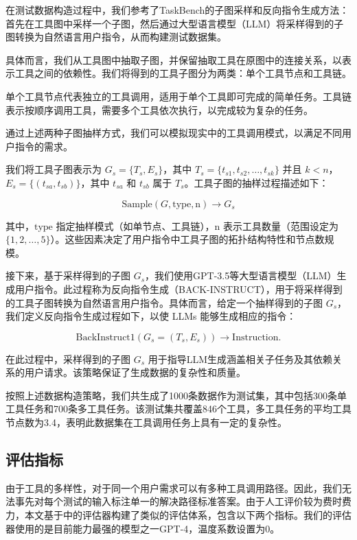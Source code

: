 在测试数据构造过程中，我们参考了TaskBench的子图采样和反向指令生成方法：首先在工具图中采样一个子图，然后通过大型语言模型（LLM）将采样得到的子图转换为自然语言用户指令，从而构建测试数据集。

具体而言，我们从工具图中抽取子图，并保留抽取工具在原图中的连接关系，以表示工具之间的依赖性。我们将得到的工具子图分为两类：单个工具节点和工具链。

单个工具节点代表独立的工具调用，适用于单个工具即可完成的简单任务。工具链表示按顺序调用工具，需要多个工具依次执行，以完成较为复杂的任务。

通过上述两种子图抽样方式，我们可以模拟现实中的工具调用模式，以满足不同用户指令的需求。

我们将工具子图表示为 \( G_s = \{T_s, E_s\} \)，其中 \( T_s = \{t_{s1}, t_{s2}, \dots, t_{sk}\} \) 并且 \( k < n \)，\( E_s = \{(t_{sa}, t_{sb})\} \)，其中 \( t_{sa} \) 和 \( t_{sb} \) 属于 \( T_s \)。工具子图的抽样过程描述如下：

\[
\text{Sample}(G, \text{type}, \text{n}) \rightarrow G_s
\]

其中，\(\text{type}\) 指定抽样模式（如单节点、工具链），\(\text{n}\) 表示工具数量（范围设定为 \(\{1, 2, \dots, 5\}\)）。这些因素决定了用户指令中工具子图的拓扑结构特性和节点数规模。

接下来，基于采样得到的子图 \( G_s \)，我们使用GPT-3.5等大型语言模型（LLM）生成用户指令。此过程称为反向指令生成（BACK-INSTRUCT），用于将采样得到的工具子图转换为自然语言用户指令。具体而言，给定一个抽样得到的子图 \( G_s \)，我们定义反向指令生成过程如下，以使 LLMs 能够生成相应的指令：

\[
\text{BackInstruct1}(G_s = (T_s, E_s)) \rightarrow \text{Instruction}.
\]

在此过程中，采样得到的子图 \( G_s \) 用于指导LLM生成涵盖相关子任务及其依赖关系的用户请求。该策略保证了生成数据的复杂性和质量。

按照上述数据构造策略，我们共生成了1000条数据作为测试集，其中包括300条单工具任务和700条多工具任务。该测试集共覆盖846个工具，多工具任务的平均工具节点数为3.4，表明此数据集在工具调用任务上具有一定的复杂性。

\subsection{评估指标}
由于工具的多样性，对于同一个用户需求可以有多种工具调用路径。因此，我们无法事先对每个测试的输入标注单一的解决路径标准答案。由于人工评价较为费时费力，本文基于\cite{Tang2023}中的评估器构建了类似的评估体系，包含以下两个指标。我们的评估器使用的是目前能力最强的模型之一GPT-4，温度系数设置为0。

